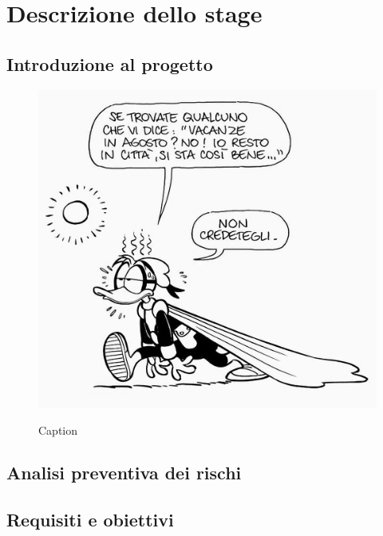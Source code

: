 \chapter{Descrizione dello stage}
\label{chap:descrizione-stage}

\section{Introduzione al progetto}
\begin{figure}[H] 
    \centering 
    \includegraphics[alt={Testo alternativo dell'immagine}, width=0.5\columnwidth]{img/pk_estate.jpeg}
    \caption{Caption}
    \label{fig:pk_estate}
\end{figure}

\section{Analisi preventiva dei rischi}


\section{Requisiti e obiettivi}

